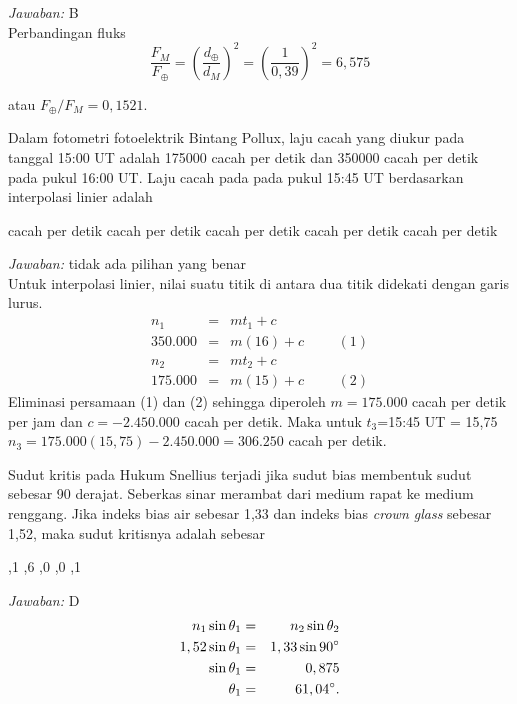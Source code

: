 \documentclass[11pt,fleqn]{exam}
\begin{document}
\begin{questions}
\textit{Jawaban: } B\\
Perbandingan fluks 
$$\frac{F_M}{F_\oplus}= \left(\frac{d_\oplus}{d_M}\right)^2= \left(\frac{1}{0,39}\right)^2=6,575$$ 

atau $F_\oplus / F_M = 0,1521$.

\question Dalam fotometri fotoelektrik Bintang Pollux, laju cacah yang diukur pada tanggal 15:00 UT adalah 175000 cacah per detik dan 350000 cacah per detik pada pukul 16:00 UT. Laju cacah pada pada pukul 15:45 UT berdasarkan interpolasi linier adalah 
\begin{choices}
 cacah per detik
 cacah per detik
 cacah per detik
 cacah per detik
 cacah per detik
\end{choices}

\textit{Jawaban: } tidak ada pilihan yang benar\\
Untuk interpolasi linier, nilai suatu titik di antara dua titik didekati dengan garis lurus.
\begin{eqnarray*}
n_1&=&mt_1+c\\
350.000&=&m(16)+c\hspace{1cm}(1)\\
n_2&=&mt_2+c\\
175.000&=&m(15)+c\hspace{1cm}(2)
\end{eqnarray*}
Eliminasi persamaan (1) dan (2) sehingga diperoleh $m=175.000$ cacah per detik per jam dan $c=-2.450.000$ cacah per detik. Maka untuk $t_3$=15:45 UT = 15,75\\ $n_3=175.000(15,75)-2.450.000=306.250$ cacah per detik.

\question Sudut kritis pada Hukum Snellius terjadi jika sudut bias membentuk sudut sebesar 90 derajat. Seberkas sinar merambat dari medium rapat ke medium renggang. Jika indeks bias air sebesar 1,33 dan indeks bias \textit{crown glass} sebesar 1,52, maka sudut kritisnya adalah sebesar
\begin{choices}
,1\degree
{},6\degree
{},0\degree 
{},0\degree 
{},1\degree 
\end{choices}

\textit{Jawaban: } D\\
\begin{eqnarray*}
n_1\sin \theta_1&=&n_2\sin \theta_2\\
1,52\sin \theta_1&=&1,33\sin 90\degree\\
\sin \theta_1&=&0,875\\
\theta_1&=&61,04\degree.
\end{eqnarray*}


\end{questions}
\end{document}

